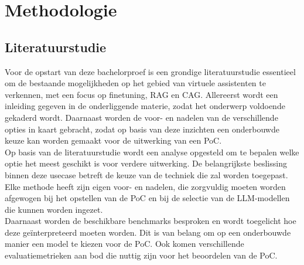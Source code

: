 
\chapter{Methodologie}
\label{ch:methodologie}


\section{Literatuurstudie}

Voor de opstart van deze bachelorproef is een grondige literatuurstudie essentieel om de bestaande mogelijkheden op het gebied van virtuele assistenten te verkennen, met een focus op finetuning, RAG en CAG. Allereerst wordt een inleiding gegeven in de onderliggende materie, zodat het onderwerp voldoende gekaderd wordt. Daarnaast worden de voor- en nadelen van de verschillende opties in kaart gebracht, zodat op basis van deze inzichten een onderbouwde keuze kan worden gemaakt voor de uitwerking van een PoC.
\\[1em]
Op basis van de literatuurstudie wordt een analyse opgesteld om te bepalen welke optie het meest geschikt is voor verdere uitwerking. De belangrijkste beslissing binnen deze usecase betreft de keuze van de techniek die zal worden toegepast. Elke methode heeft zijn eigen voor- en nadelen, die zorgvuldig moeten worden afgewogen bij het opstellen van de PoC en bij de selectie van de LLM-modellen die kunnen worden ingezet.
\\[1em]
Daarnaast worden de beschikbare benchmarks besproken en wordt toegelicht hoe deze geïnterpreteerd moeten worden. Dit is van belang om op een onderbouwde manier een model te kiezen voor de PoC. Ook komen verschillende evaluatiemetrieken aan bod die nuttig zijn voor het beoordelen van de PoC.

